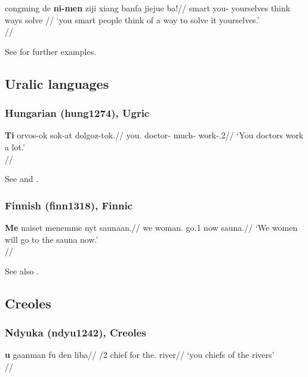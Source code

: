 \ex \begingl
\gla congming de \textbf{ni-men} ziji xiang banfa jiejue ba!//
\glb smart \Lnk{} you-\Pl{} yourselves think ways solve \Exclam{}//
\glft `you smart people think of a way to solve it yourselves.'\\\citep[after][(53a)]{boskovichsieh2013}//
\endgl
\xe 

See \citet[sec. 7.3]{boskovichsieh2013} for further examples.


\subsection{Uralic languages}


\subsubsection{Hungarian (hung1274), Ugric}

\ex \begingl
\gla \textbf{Ti} orvos-ok sok-at dolgoz-tok.//
\glb you.\Pl{} doctor-\Pl{} much-\Acc{} work-\Indf.2\Pl//
\glft `You doctors work a lot.' \\\citep[269, (492)]{keneseietal1998}//
\endgl
\xe

See \citet[269]{keneseietal1998} and \citealp[559]{hoehn2015unagr}.

\newpage

\subsubsection{Finnish (finn1318), Finnic}

\ex \begingl
\gla \textbf{Me\textbf{}} naiset menemme nyt saunaan.//
\glb we woman.\Pl{} go.1\Pl{} now sauna.\Ill//
\glft `We women will go to the sauna now.'\\\citep[277, (1335)]{sulkalakarjalainen1992}//
\endgl
\xe

See also \citet[24f.]{hoehn2020ThirdGap}.


\subsection{Creoles}


\subsubsection{Ndyuka (ndyu1242), Creoles}

\ex \begingl
\gla \textbf{u} gaanman fu den liba//
/2\Pl{} chief for the.\Pl{} river//
\glft `you chiefs of the rivers'\\\citep[467, (2075)]{huttarhuttar1994}//
\endgl
\xe

